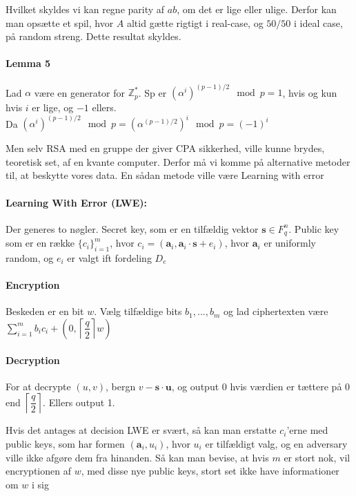\documentclass[paper=a4, fontsize=11pt]{scrartcl} %
\numberwithin{equation}{section} %
\numberwithin{figure}{section} %
\numberwithin{table}{section} %
\begin{document}
	Hvilket skyldes vi kan regne parity af $ab$, om det er lige eller ulige. Derfor kan man opsætte et spil, hvor $A$ altid gætte rigtigt i real-case, og $50/50$ i ideal case, på random streng. Dette resultat skyldes.
	
	\paragraph{\textbf{Lemma 5}} Lad $\alpha$ være en generator for $\mathbb{Z}_p^*$. Sp er $(\alpha^i)^{(p-1)/2}\mod{p}=1$, hvis og kun hvis $i$ er lige, og $-1$ ellers. \\
	
	Da $(\alpha^i)^{(p-1)/2}\mod{p}=(\alpha^{(p-1)/2})^i\mod{p}=(-1)^i$
	
	Men selv RSA med en gruppe der giver CPA sikkerhed, ville kunne brydes, teoretisk set, af en kvante computer. Derfor må vi komme på alternative metoder til, at beskytte vores data. En sådan metode ville være Learning with error
	
	\begin{mdframed}
		\paragraph{\textbf{Learning With Error (LWE):}} Der generes to nøgler. Secret key, som er en tilfældig vektor $\mathbf{s}\in F^n_q$. Public key som er en række $\{c_i\}^m_{i=1}$, hvor $c_i=(\mathbf{a}_i,\mathbf{a}_i\cdot\mathbf{s}+e_i)$, hvor $\mathbf{a}_i$ er uniformly random, og $e_i$ er valgt ift fordeling $D_e$ 
		
		\paragraph{\textbf{Encryption}} Beskeden er en bit $w$. Vælg tilfældige bits $b_1,...,b_m$ og lad ciphertexten være $\sum_{i=1}^{m}b_ic_i+(0,\left\lceil \dfrac{q}{2}\right\rceil w)$
		
		\paragraph{\textbf{Decryption}} For at decrypte $(u,v)$, bergn $v-\mathbf{s}\cdot\mathbf{u}$, og output $0$ hvis værdien er tættere på $0$ end $\left\lceil\dfrac{q}{2}\right\rceil$. Ellers output 1.
	\end{mdframed}
	
	Hvis det antages at decision LWE er svært, så kan man erstatte $c_i$'erne med public keys, som har formen $(\mathbf{a}_i,u_i)$, hvor $u_i$ er tilfældigt valg, og en adversary ville ikke afgøre dem fra hinanden. Så kan man bevise, at hvis $m$ er stort nok, vil encryptionen af $w$, med disse nye public keys, stort set ikke have informationer om $w$ i sig
	
\end{document}
